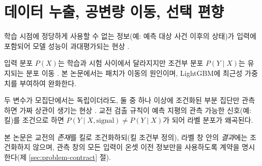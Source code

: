 
\section{데이터 누출, 공변량 이동, 선택 편향}
\label{sec:bg-leakage}

\begin{definition}[데이터 누출]
학습 시점에 정당하게 사용할 수 없는 정보(예: 예측 대상 사건 이후의 상태)가 입력에 포함되어 모델 성능이 과대평가되는 현상 \cite{kaufman2012leakage}.
\end{definition}

\begin{definition}[공변량 이동]
입력 분포 $P(X)$는 학습과 시험 사이에서 달라지지만 조건부 분포 $P(Y \mid X)$는 유지되는 분포 이동 \cite{shimodaira2000improving,quinonero2009dataset}. 본 논문에서는 패치가 이동의 원인이며, LightGBM에 최근성 가중치를 부여하여 완화한다.
\end{definition}

\begin{definition}[Berkson의 역설]
두 변수가 모집단에서는 독립이더라도, 둘 중 하나 이상에 조건화된 부분 집단만 관측하면 가짜 상관이 생기는 현상 \cite{berkson1946limitations}. 교전 검출 규칙이 예측 지평의 관측 가능한 신호(예: 킬)를 조건으로 하면 $P(Y\mid X, \text{signal}) \ne P(Y \mid X)$가 되어 라벨 분포가 왜곡된다.
\end{definition}

본 논문은 교전의 \emph{존재}를 킬로 조건화하되(킬 조건부 정의), 라벨 창 안의 \emph{결과}에는 조건화하지 않으며, 관측 창의 모든 입력이 온셋 이전 정보만을 사용하도록 계약을 명시한다(제 \ref{sec:problem-contract} 절).
